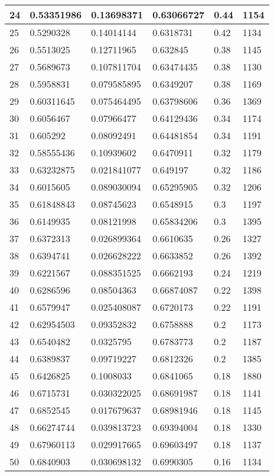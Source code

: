 \begin{longtable}{|l|l|l|l|l|l|}
24 & 0.53351986 & 0.13698371 & 0.63066727 & 0.44 & 1154 \\ \hline 
25 & 0.5290328 & 0.14014144 & 0.6318731 & 0.42 & 1134 \\ \hline 
26 & 0.5513025 & 0.12711965 & 0.632845 & 0.38 & 1145 \\ \hline 
27 & 0.5689673 & 0.107811704 & 0.63474435 & 0.38 & 1130 \\ \hline 
28 & 0.5958831 & 0.079585895 & 0.6349207 & 0.38 & 1169 \\ \hline 
29 & 0.60311645 & 0.075464495 & 0.63798606 & 0.36 & 1369 \\ \hline 
30 & 0.6056467 & 0.07966477 & 0.64129436 & 0.34 & 1174 \\ \hline 
31 & 0.605292 & 0.08092491 & 0.64481854 & 0.34 & 1191 \\ \hline 
32 & 0.58555436 & 0.10939602 & 0.6470911 & 0.32 & 1179 \\ \hline 
33 & 0.63232875 & 0.021841077 & 0.649197 & 0.32 & 1186 \\ \hline 
34 & 0.6015605 & 0.089030094 & 0.65295905 & 0.32 & 1206 \\ \hline 
35 & 0.61848843 & 0.08745623 & 0.6548915 & 0.3 & 1197 \\ \hline 
36 & 0.6149935 & 0.08121998 & 0.65834206 & 0.3 & 1395 \\ \hline 
37 & 0.6372313 & 0.026899364 & 0.6610635 & 0.26 & 1327 \\ \hline 
38 & 0.6394741 & 0.026628222 & 0.6633852 & 0.26 & 1392 \\ \hline 
39 & 0.6221567 & 0.088351525 & 0.6662193 & 0.24 & 1219 \\ \hline 
40 & 0.6286596 & 0.08504363 & 0.66874087 & 0.22 & 1398 \\ \hline 
41 & 0.6579947 & 0.025408087 & 0.6720173 & 0.22 & 1191 \\ \hline 
42 & 0.62954503 & 0.09352832 & 0.6758888 & 0.2 & 1173 \\ \hline 
43 & 0.6540482 & 0.0325795 & 0.6783773 & 0.2 & 1187 \\ \hline 
44 & 0.6389837 & 0.09719227 & 0.6812326 & 0.2 & 1385 \\ \hline 
45 & 0.6426825 & 0.1008033 & 0.6841065 & 0.18 & 1880 \\ \hline 
46 & 0.6715731 & 0.030322025 & 0.68691987 & 0.18 & 1141 \\ \hline 
47 & 0.6852545 & 0.017679637 & 0.68981946 & 0.18 & 1145 \\ \hline 
48 & 0.66274744 & 0.039813723 & 0.69394004 & 0.18 & 1330 \\ \hline 
49 & 0.67960113 & 0.029917665 & 0.69603497 & 0.18 & 1137 \\ \hline 
50 & 0.6840903 & 0.030698132 & 0.6990305 & 0.16 & 1134 \\ \hline 
\end{longtable}